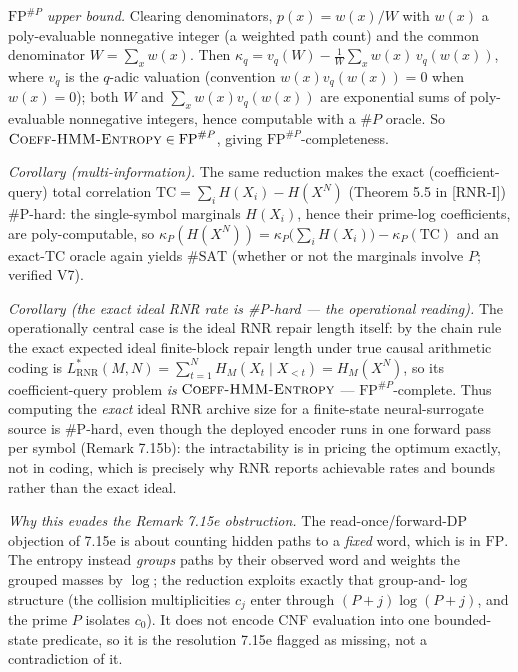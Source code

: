 \documentclass[
]{article}
\begin{document}
\emph{$\mathrm{FP}^{\#P}$ upper bound.} Clearing denominators, $p(x)=w(x)/W$ with $w(x)$ a
poly-evaluable nonnegative integer (a weighted path count) and the common denominator
$W=\sum_x w(x)$. Then $\kappa_q=v_q(W)-\frac1W\sum_x w(x)\,v_q(w(x))$, where $v_q$ is the
$q$-adic valuation (convention $w(x)v_q(w(x))=0$ when $w(x)=0$); both $W$ and
$\sum_x w(x)v_q(w(x))$ are exponential sums of poly-evaluable nonnegative integers, hence
computable with a $\#P$ oracle. So
$\textsc{Coeff-HMM-Entropy}\in\mathrm{FP}^{\#P}$, giving $\mathrm{FP}^{\#P}$-completeness.

\emph{Corollary (multi-information).} The same reduction makes the exact (coefficient-query)
total correlation $\mathrm{TC}=\sum_i H(X_i)-H(X^N)$ (Theorem 5.5 in [RNR-I]) \#P-hard: the single-symbol
marginals $H(X_i)$, hence their prime-log coefficients, are poly-computable, so
$\kappa_P(H(X^N))=\kappa_P\!\bigl(\sum_i H(X_i)\bigr)-\kappa_P(\mathrm{TC})$ and an exact-$\mathrm{TC}$
oracle again yields $\#\mathrm{SAT}$ (whether or not the marginals involve $P$; verified V7).

\emph{Corollary (the exact ideal RNR rate is \#P-hard --- the operational reading).} The
operationally central case is the ideal RNR repair length itself: by the chain rule the exact
expected ideal finite-block repair length under true causal arithmetic coding is
$L^\ast_{\mathrm{RNR}}(M,N)=\sum_{t=1}^N H_M(X_t\mid X_{<t})=H_M(X^N)$, so its coefficient-query
problem \emph{is} $\textsc{Coeff-HMM-Entropy}$ --- $\mathrm{FP}^{\#P}$-complete. Thus computing the
\emph{exact} ideal RNR archive size for a finite-state neural-surrogate source is \#P-hard, even
though the deployed encoder runs in one forward pass per symbol (Remark 7.15b): the intractability
is in pricing the optimum exactly, not in coding, which is precisely why RNR reports achievable
rates and bounds rather than the exact ideal.

\emph{Why this evades the Remark 7.15e obstruction.} The read-once/forward-DP objection of 7.15e
is about counting hidden paths to a \emph{fixed} word, which is in $\mathrm{FP}$. The entropy
instead \emph{groups} paths by their observed word and weights the grouped masses by $\log$; the
reduction exploits exactly that group-and-$\log$ structure (the collision multiplicities $c_j$
enter through $(P+j)\log(P+j)$, and the prime $P$ isolates $c_0$). It does not encode CNF
evaluation into one bounded-state predicate, so it is the resolution 7.15e flagged as missing,
not a contradiction of it.
\end{document}

